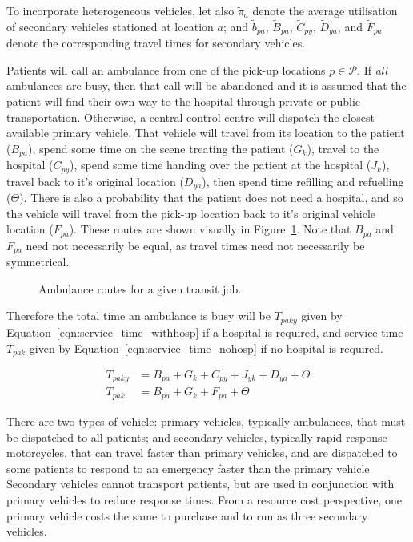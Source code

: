 \documentclass[preprint,12pt]{elsarticle}
\begin{document}
To incorporate heterogeneous vehicles, let also $\tilde{\pi}_a$ denote the
average utilisation of secondary vehicles stationed at location $a$; and
$\tilde{b}_{pa}$, $\tilde{B}_{pa}$, $\tilde{C}_{py}$, $\tilde{D}_{ya}$, and
$\tilde{F}_{pa}$ denote the corresponding travel times for secondary vehicles.

Patients will call an ambulance from one of the pick-up locations
$p \in \mathcal{P}$. If \textit{all} ambulances are busy, then that call will be
abandoned and it is assumed that the patient will find their own way to the
hospital through private or public transportation. Otherwise, a central control
centre will dispatch the closest available primary vehicle. That vehicle will
travel from its location to the patient ($B_{pa}$), spend some time on the scene
treating the patient ($G_k$), travel to the hospital ($C_{py}$), spend some time
handing over the patient at the hospital ($J_k$), travel back to it's original
location ($D_{ya}$), then spend time refilling and refuelling ($\Theta$).
There is also a probability that the patient does not need a hospital, and so
the vehicle will travel from the pick-up location back to it's original vehicle
location ($F_{pa}$). These routes are shown visually in
Figure~\ref{fig:travel_routes}. Note that $B_{pa}$ and $F_{pa}$ need not
necessarily be equal, as travel times need not necessarily be symmetrical.

\begin{figure}
    \centering
    
    \caption{Ambulance routes for a given transit job.}
    \label{fig:travel_routes}
\end{figure}

Therefore the total time an ambulance is busy will be $T_{paky}$ given by
Equation~\ref{eqn:service_time_withhosp} if a hospital is required, and
service time $T_{pak}$ given by Equation~\ref{eqn:service_time_nohosp} if no
hospital is required.

\begin{align}
T_{paky} &= B_{pa} + G_k + C_{py} + J_{yk} + D_{ya} + \Theta \label{eqn:service_time_withhosp} \\
T_{pak} &= B_{pa} + G_k + F_{pa} + \Theta \label{eqn:service_time_nohosp}
\end{align}

There are two types of vehicle: primary vehicles, typically ambulances, that
must be dispatched to all patients; and secondary vehicles, typically rapid
response motorcycles, that can travel faster than primary vehicles, and are
dispatched to some patients to respond to an emergency faster than the primary
vehicle. Secondary vehicles cannot transport patients, but are used in
conjunction with primary vehicles to reduce response times.
From a resource cost perspective, one primary vehicle costs the same to purchase
and to run as three secondary vehicles.
\end{document}

